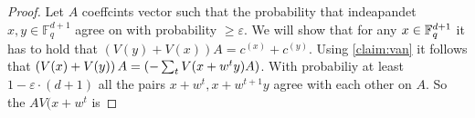 \begin{proof}
  Let $A$ coeffcints vector such that the probability that indeapandet $x,y \in \mathbb{F}_{q}^{d+1}$ agree on with probability $\ge \varepsilon$. We will show that for any $x \in \mathbb{F}_{q}^{d+1}$ it has to hold that $\left(V(y) + V(x)\right)A = c^{(x)} + c^{(y)}$. Using \cref{claim:van} it follows that $\left( V(x) + V(y) \right) A = \left(-\sum_{t}{V(x + w^{t}y)} A \right) $. With probabiliy at least $ 1 - \varepsilon \cdot \left( d+1 \right) $ all the pairs $ x+ w^{t},x + w^{t+1}y$ agree with each other on $A$. So the $AV(x+w^{t}$ is    
\end{proof}





